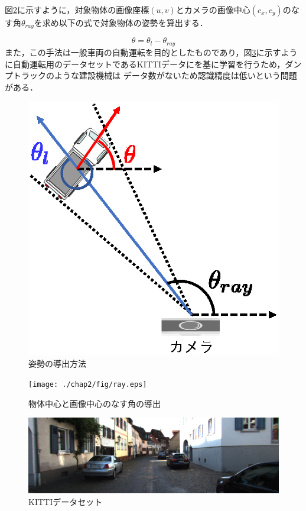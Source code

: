 図\ref{fig:ray}に示すように，対象物体の画像座標$(u, v)$とカメラの画像中心$(c_x, c_y)$のなす角$\theta_{ray}$を求め以下の式で対象物体の姿勢を算出する．


\begin{equation}
    \theta =
     \theta_l-\theta_{ray}
 \end{equation}
また，この手法は一般車両の自動運転を目的としたものであり，図\ref{fig:kitti}に示すように自動運転用のデータセットであるKITTIデータにを基に学習を行うため，ダンプトラックのような建設機械は
データ数がないため認識精度は低いという問題がある．
\clearpage

\begin{figure}[b]
    \begin{center}
    \includegraphics[width=0.5\columnwidth]{./chap2/fig/3DBox.eps}
    \caption{姿勢の導出方法}
    \label{fig:pose}
    \end{center}
\end{figure}


\begin{figure}[b]
    \begin{center}
    \texttt{[image: ./chap2/fig/ray.eps]}
    \caption{物体中心と画像中心のなす角の導出}
    \label{fig:ray}
    \end{center}
\end{figure}

\begin{figure}[b]
    \begin{center}
    \includegraphics[width=0.8\columnwidth]{./chap2/fig/kitti.eps}
    \caption{KITTIデータセット}
    \label{fig:kitti}
    \end{center}
\end{figure}


